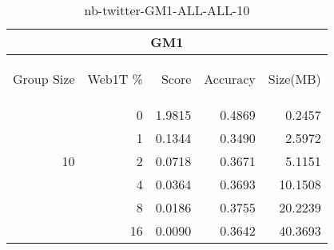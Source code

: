 \begin{center}
\begin{table}[htbp]
\begin{tabular}{ | r | r | r | r | r |}
\hline
\multicolumn{5}{|c|}{GM1}\\
\hline
\begin{sideways}Group Size\end{sideways} & \begin{sideways}Web1T \%\end{sideways} & \begin{sideways}Score\end{sideways} & \begin{sideways}Accuracy\end{sideways} & \begin{sideways}Size(MB)\end{sideways}\\
\hline
\multirow{5}{*}{10}
 & 0 & 1.9815 & 0.4869 & 0.2457\\ \cline{2-5}
 & 1 & 0.1344 & 0.3490 & 2.5972\\ \cline{2-5}
 & 2 & 0.0718 & 0.3671 & 5.1151\\ \cline{2-5}
 & 4 & 0.0364 & 0.3693 & 10.1508\\ \cline{2-5}
 & 8 & 0.0186 & 0.3755 & 20.2239\\ \cline{2-5}
 & 16 & 0.0090 & 0.3642 & 40.3693\\ \cline{2-5}
\hline
\end{tabular}
\caption{nb-twitter-GM1-ALL-ALL-10}
\label{table:nb-twitter-GM1-ALL-ALL-10}
\end{table}
\end{center}

